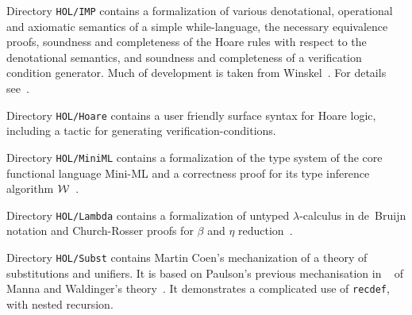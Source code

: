 Directory \texttt{HOL/IMP} contains a formalization of various denotational,
operational and axiomatic semantics of a simple while-language, the necessary
equivalence proofs, soundness and completeness of the Hoare rules with respect
to the 
denotational semantics, and soundness and completeness of a verification
condition generator.  Much of development is taken from
Winskel~\cite{winskel93}.  For details see~\cite{nipkow-IMP}.

Directory \texttt{HOL/Hoare} contains a user friendly surface syntax for Hoare
logic, including a tactic for generating verification-conditions.

Directory \texttt{HOL/MiniML} contains a formalization of the type system of the
core functional language Mini-ML and a correctness proof for its type
inference algorithm $\cal W$~\cite{milner78,nazareth-nipkow}.

Directory \texttt{HOL/Lambda} contains a formalization of untyped
$\lambda$-calculus in de~Bruijn notation and Church-Rosser proofs for $\beta$
and $\eta$ reduction~\cite{Nipkow-CR}.

Directory \texttt{HOL/Subst} contains Martin Coen's mechanization of a theory of
substitutions and unifiers.  It is based on Paulson's previous
mechanisation in {\LCF}~\cite{paulson85} of Manna and Waldinger's
theory~\cite{mw81}.  It demonstrates a complicated use of \texttt{recdef},
with nested recursion.

